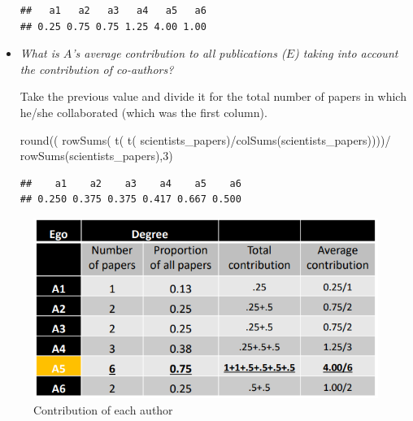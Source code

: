\documentclass[
  notitlepage,
  onecolumn,
  openany]{book}
\newenvironment{Shaded}{\begin{snugshade}}{\end{snugshade}}
\newcommand{\DecValTok}[1]{\textcolor[rgb]{0.00,0.00,0.81}{#1}}
\newcommand{\FunctionTok}[1]{\textcolor[rgb]{0.00,0.00,0.00}{#1}}
\newcommand{\NormalTok}[1]{#1}
\newcommand{\SpecialCharTok}[1]{\textcolor[rgb]{0.00,0.00,0.00}{#1}}
\begin{document}
\begin{itemize}
\begin{verbatim}
##   a1   a2   a3   a4   a5   a6 
## 0.25 0.75 0.75 1.25 4.00 1.00
\end{verbatim}
\item
  \emph{What is \(A\)'s average contribution to all publications (\(E\)) taking into account the contribution of co-authors?}

  Take the previous value and divide it for the total number of papers in which he/she collaborated (which was the first column).

\begin{Shaded}
\begin{Highlighting}[]
\FunctionTok{round}\NormalTok{((}
  \FunctionTok{rowSums}\NormalTok{(}
    \FunctionTok{t}\NormalTok{(}
      \FunctionTok{t}\NormalTok{(}
\NormalTok{        scientists\_papers)}\SpecialCharTok{/}\FunctionTok{colSums}\NormalTok{(scientists\_papers))))}\SpecialCharTok{/}
    \FunctionTok{rowSums}\NormalTok{(scientists\_papers),}\DecValTok{3}\NormalTok{) }
\end{Highlighting}
\end{Shaded}

\begin{verbatim}
##    a1    a2    a3    a4    a5    a6 
## 0.250 0.375 0.375 0.417 0.667 0.500
\end{verbatim}
\end{itemize}

\begin{figure}[h!]

{\centering \includegraphics[width=0.5\linewidth]{images/10-Two mode networks/Untitled 5} 

}

\caption{Contribution of each author}\label{fig:unnamed-chunk-70}
\end{figure}
\end{document}
